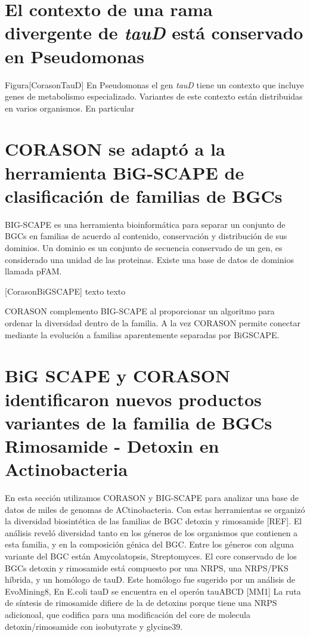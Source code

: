 \documentclass[12pt,twoside]{reedthesis}
\begin{document}
  \section{\texorpdfstring{El contexto de una rama divergente de
  \emph{tauD} está conservado en
  Pseudomonas}{El contexto de una rama divergente de tauD está conservado en Pseudomonas}}\label{el-contexto-de-una-rama-divergente-de-taud-esta-conservado-en-pseudomonas}
  
  Figura{[}CorasonTauD{]} En Pseudomonas el gen \emph{tauD} tiene un
  contexto que incluye genes de metabolismo especializado. Variantes de
  este contexto están distribuidas en varios organismos. En particular
  
  \section{CORASON se adaptó a la herramienta BiG-SCAPE de clasificación
  de familias de
  BGCs}\label{corason-se-adapto-a-la-herramienta-big-scape-de-clasificacion-de-familias-de-bgcs}
  
  BIG-SCAPE es una herramienta bioinformática para separar un conjunto de
  BGCs en familias de acuerdo al contenido, conservación y distribución de
  sus dominios. Un dominio es un conjunto de secuencia conservado de un
  gen, es considerado una unidad de las proteinas. Existe una base de
  datos de dominios llamada pFAM.
  
  {[}CorasonBiGSCAPE{]} texto texto
  
  CORASON complemento BIG-SCAPE al proporcionar un algoritmo para ordenar
  la diversidad dentro de la familia. A la vez CORASON permite conectar
  mediante la evolución a familias aparentemente separadas por BiGSCAPE.
  
  \section{BiG SCAPE y CORASON identificaron nuevos productos variantes de
  la familia de BGCs Rimosamide - Detoxin en
  Actinobacteria}\label{big-scape-y-corason-identificaron-nuevos-productos-variantes-de-la-familia-de-bgcs-rimosamide---detoxin-en-actinobacteria}
  
  En esta sección utilizamos CORASON y BIG-SCAPE para analizar una base de
  datos de miles de genomas de ACtinobacteria. Con estas herramientas se
  organizó la diversidad biosintética de las familias de BGC detoxin y
  rimosamide {[}REF{]}. El análisis reveló diversidad tanto en los géneros
  de los organismos que contienen a esta familia, y en la composición
  génica del BGC. Entre los géneros con alguna variante del BGC están
  Amycolatopsis, Streptomyces. El core conservado de los BGCs detoxin y
  rimosamide está compuesto por una NRPS, una NRPS/PKS híbrida, y un
  homólogo de tauD. Este homólogo fue sugerido por un análisis de
  EvoMining8, En E.coli tauD se encuentra en el operón tauABCD {[}MM1{]}
  La ruta de síntesis de rimosamide difiere de la de detoxins porque tiene
  una NRPS adicionoal, que codifica para una modificación del core de
  molecula detoxin/rimosamide con isobutyrate y glycine39.
  
\end{document}
